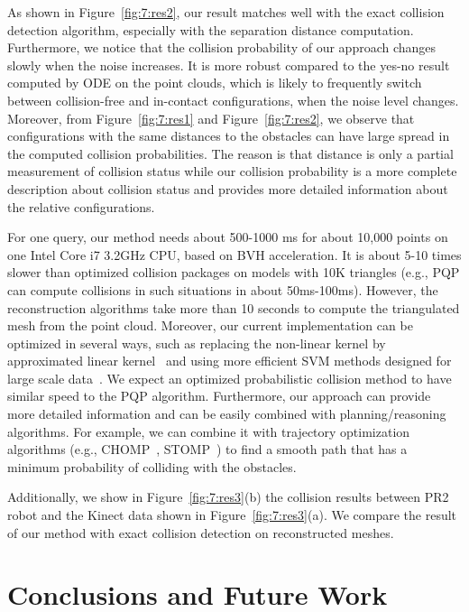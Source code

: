 As shown in Figure~\ref{fig:7:res2}, our result matches well with the exact collision detection algorithm, especially with the separation distance computation. Furthermore, we notice that the collision probability of our approach changes slowly when the noise increases. It is more robust compared to the yes-no result computed by ODE on the point clouds, which is likely to frequently switch between collision-free and in-contact configurations, when the noise level changes.
Moreover, from Figure~\ref{fig:7:res1} and Figure~\ref{fig:7:res2}, we observe that configurations with the same distances to the obstacles can have large spread in the computed collision probabilities. The reason is that distance is only a partial measurement of collision status while our collision probability is a more complete description about collision status and provides more detailed information about the relative configurations.

For one query, our method needs about 500-1000 ms for about 10,000 points on one Intel Core i7 3.2GHz CPU, based on BVH acceleration. It is about 5-10 times slower than optimized collision packages on models with 10K triangles (e.g., PQP can compute collisions in such situations in about 50ms-100ms). However, the reconstruction algorithms take more than 10 seconds to compute the triangulated mesh from the point cloud. Moreover, our current implementation can be optimized in several ways, such as replacing the non-linear kernel by approximated linear kernel~\cite{Ali:nips:2007} and using more efficient SVM methods designed for large scale data~\cite{Fan:2008:LLL}. We expect an optimized probabilistic collision method to have similar speed to the PQP algorithm. Furthermore, our approach can provide more detailed information and can be easily combined with planning/reasoning algorithms. For example, we can combine it with trajectory optimization algorithms (e.g., CHOMP~\cite{Ratliff:2009}, STOMP~\cite{Mrinal:2011}) to find a smooth path that has a minimum probability of colliding with the obstacles.

Additionally, we show in Figure~\ref{fig:7:res3}(b) the collision results between PR2 robot and the Kinect data shown in Figure~\ref{fig:7:res3}(a). We compare the result of our method with exact collision detection on reconstructed meshes.





\section{Conclusions and Future Work}

